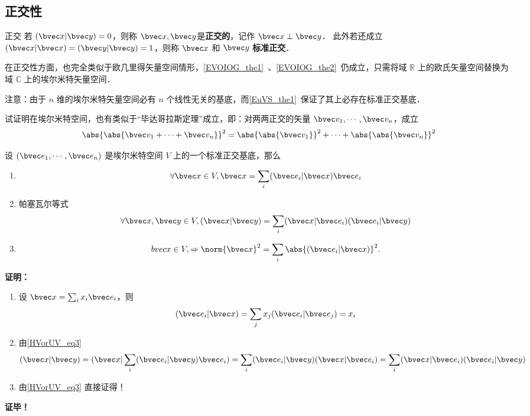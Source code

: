 \subsection{正交性}
\begin{definition}{正交}
若 $(\bvec x|\bvec y)=0$，则称 $\bvec x,\bvec y$是\textbf{正交的}，记作 $\bvec x\perp\bvec y$．
此外若还成立 $(\bvec x|\bvec x)=(\bvec y|\bvec y)=1$，则称 $\bvec x$ 和 $\bvec y$ \textbf{标准正交}．
\end{definition}
在正交性方面，也完全类似于欧几里得矢量空间情形，\autoref{EVOIOG_the1}~、\autoref{EVOIOG_the2}~仍成立，只需将域 $\mathbb{R}$ 上的欧氏矢量空间替换为域 $\mathbb{C}$ 上的埃尔米特矢量空间．

注意：由于 $n$ 维的埃尔米特矢量空间必有 $n$ 个线性无关的基底，而\autoref{EuVS_the1}~保证了其上必存在标准正交基底．
\begin{example}{}
试证明在埃尔米特空间，也有类似于“毕达哥拉斯定理”成立，即：对两两正交的矢量 $\bvec v_1,\cdots,\bvec v_n$，成立
\begin{equation}
\abs{\abs{\bvec v_1+\cdots+\bvec v_n}}^2=\abs{\abs{\bvec v_1}}^2+\cdots+\abs{\abs{\bvec v_n}}^2
\end{equation}
\end{example}

\begin{theorem}{}
设 $(\bvec e_1,\cdots,\bvec e_n)$ 是埃尔米特空间 $V$ 上的一个标准正交基底，那么
\begin{enumerate}
\item \begin{equation}\label{HVorUV_eq3}
\forall\bvec x\in V,\bvec x=\sum_{i}(\bvec e_i|\bvec x)\bvec e_i
\end{equation}
\item 帕塞瓦尔等式
\begin{equation}
\forall\bvec x,\bvec y\in V,(\bvec x|\bvec y)=\sum_{i}(\bvec x|\bvec e_i)(\bvec e_i|\bvec y)
\end{equation}
\item \begin{equation}
\\bvec x\in V,\Rightarrow\norm{\bvec x}^2=\sum_{i}\abs{(\bvec e_i|\bvec x)}^2.
\end{equation}
\end{enumerate}
\end{theorem}
\textbf{证明：}\begin{enumerate}
\item 设 $\bvec x=\sum_{i}x_i\bvec e_i$，则
\begin{equation}
(\bvec e_i|\bvec x)=\sum_{j}x_j(\bvec e_i|\bvec e_j)=x_i
\end{equation}
\item 由\autoref{HVorUV_eq3} 
\begin{equation}
(\bvec x|\bvec y)=(\bvec x|\sum_{i}(\bvec e_i|\bvec y)\bvec e_i)=\sum_{i}(\bvec e_i|\bvec y)(\bvec x|\bvec e_i)=\sum_{i}(\bvec x|\bvec e_i)(\bvec e_i|\bvec y)
\end{equation}
\item 由\autoref{HVorUV_eq3} 直接证得！
\end{enumerate}
\textbf{证毕！}
